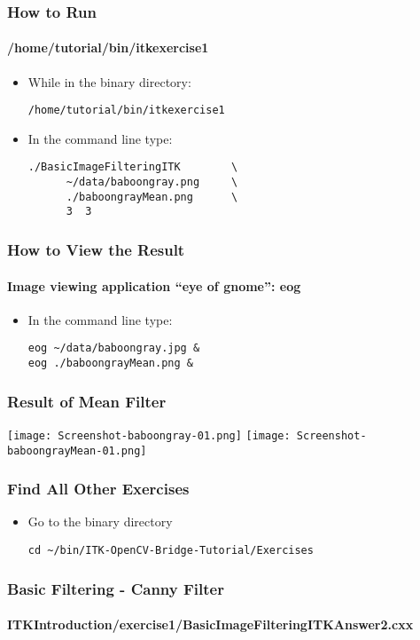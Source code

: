 \begin{frame}[fragile]
\frametitle{How to Run}
\framesubtitle{/home/tutorial/bin/itkexercise1}
\begin{itemize}
\item While in the binary directory:
\begin{verbatim}
/home/tutorial/bin/itkexercise1
\end{verbatim}
\item In the command line type:
\begin{verbatim}
./BasicImageFilteringITK        \
      ~/data/baboongray.png     \
      ./baboongrayMean.png      \
      3  3
\end{verbatim}
\end{itemize}
\end{frame}

\begin{frame}[fragile]
\frametitle{How to View the Result}
\framesubtitle{Image viewing application ``eye of gnome'': eog}
\begin{itemize}
\item In the command line type:
\begin{verbatim}
eog ~/data/baboongray.jpg &
eog ./baboongrayMean.png &
\end{verbatim}
\end{itemize}
\end{frame}

\begin{frame}[fragile]
\frametitle{Result of Mean Filter}
\begin{center}
  \texttt{[image: Screenshot-baboongray-01.png]}
  \texttt{[image: Screenshot-baboongrayMean-01.png]}
\end{center}
\end{frame}

\begin{frame}[fragile]
\frametitle{Find All Other Exercises}
\begin{itemize}
\item Go to the binary directory
\begin{verbatim}
cd ~/bin/ITK-OpenCV-Bridge-Tutorial/Exercises
\end{verbatim}
\end{itemize}
\end{frame}

\begin{frame}
\frametitle{Basic Filtering - Canny Filter}
\framesubtitle{ITKIntroduction/exercise1/BasicImageFilteringITKAnswer2.cxx}
\end{frame}


